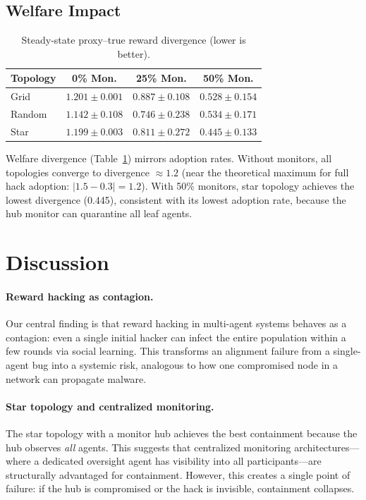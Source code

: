 \documentclass[11pt]{article}
\begin{document}
\subsection{Welfare Impact}

\begin{table}[h]
\centering
\small
\caption{Steady-state proxy--true reward divergence (lower is better).}
\label{tab:welfare}
\begin{tabular}{lccc}
\toprule
\textbf{Topology} & \textbf{0\% Mon.} & \textbf{25\% Mon.} & \textbf{50\% Mon.} \\
\midrule
Grid   & $1.201 \pm 0.001$ & $0.887 \pm 0.108$ & $0.528 \pm 0.154$ \\
Random & $1.142 \pm 0.108$ & $0.746 \pm 0.238$ & $0.534 \pm 0.171$ \\
Star   & $1.199 \pm 0.003$ & $0.811 \pm 0.272$ & $0.445 \pm 0.133$ \\
\bottomrule
\end{tabular}
\end{table}

Welfare divergence (Table~\ref{tab:welfare}) mirrors adoption rates.
Without monitors, all topologies converge to divergence $\approx 1.2$ (near the theoretical maximum for full hack adoption: $|1.5 - 0.3| = 1.2$).
With 50\% monitors, star topology achieves the lowest divergence (0.445), consistent with its lowest adoption rate, because the hub monitor can quarantine all leaf agents.

\section{Discussion}

\paragraph{Reward hacking as contagion.}
Our central finding is that reward hacking in multi-agent systems behaves as a contagion: even a single initial hacker can infect the entire population within a few rounds via social learning.
This transforms an alignment failure from a single-agent bug into a systemic risk, analogous to how one compromised node in a network can propagate malware.

\paragraph{Star topology and centralized monitoring.}
The star topology with a monitor hub achieves the best containment because the hub observes \emph{all} agents.
This suggests that centralized monitoring architectures---where a dedicated oversight agent has visibility into all participants---are structurally advantaged for containment.
However, this creates a single point of failure: if the hub is compromised or the hack is invisible, containment collapses.
\end{document}
